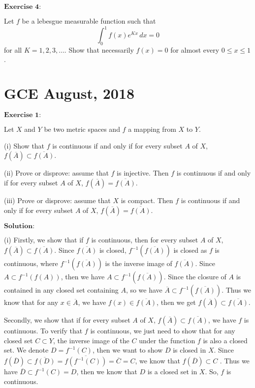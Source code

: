 \documentclass[12pt]{article}
\begin{document}
$\textbf{Exercise 4:}$

Let $f$ be a lebesgue measurable function such that 
\begin{equation*}
   \int_{0}^{1} f(x) e^{Kx} \, d x = 0
\end{equation*}
for all $K = 1, 2, 3, \dots$. Show that necessarily $f(x) = 0$ for almost every $0 \leq x \leq 1$. 



\newpage


\section{ GCE August, 2018}

$\textbf{Exercise 1:}$

Let $X$ and $Y$ be two metric spaces and $f$ a mapping from $X$ to $Y$.

(i) Show that $f$ is continuous if and only if for every subset $A$ of $X$, $f(\overline{A}) \subset  \overline{f(A)}$.

(ii) Prove or disprove: assume that $f$ is injective. Then $f$ is continuous if and only if for every subset $A$ of $X$, $f(\overline{A}) = \overline{f(A)}$. 

(iii) Prove or disprove: assume that $X$ is compact. Then $f$ is continuous if and only if for every subset $A$ of $X$, $f(\overline{A}) = \overline{f(A)}$. 

\vspace{8pt}

$\textbf{Solution:}$

(i) Firstly, we show that if $f$ is continuous, then for every subset $A$ of $X$, $f(\overline{A}) \subset  \overline{f(A)}$. Since $\overline{f(A)}$ is closed, $f^{-1}(\overline{f(A)})$ is closed as $f$ is continuous, where $f^{-1}(\overline{f(A)})$ is the inverse image of $\overline{f(A)}$. Since $A \subset f^{-1} (f(A))$, then we have $A \subset f^{-1}( \overline{f(A)})$. Since the closure of $A$ is contained in any closed set containing $A$, so we have $\overline{A} \subset f^{-1} (\overline{f(A)})$. Thus we know that for any $x \in \overline{A}$, we have $f(x) \in \overline{f(A)}$, then we get $f(\overline{A}) \subset  \overline{f(A)}$.

Secondly, we show that if for every subset $A$ of $X$, $f(\overline{A}) \subset  \overline{f(A)}$, we have $f$ is continuous. To verify that $f$ is continuous, we just need to show that for any closed set $C \subset Y$, the inverse image of the $C$ under the function $f$ is also a closed set. We denote $D = f^{-1}(C)$, then we want to show $D$ is closed in $X$. Since $f(\overline{D}) \subset \overline{f(D)} = \overline{f(f^{-1}(C))} = \overline{C} = C$, we know that $f(\overline{D}) \subset C$
. Thus we have $\overline{D} \subset f^{-1}(C) = D$, then we know that $D$ is a closed set in $X$. So, $f$ is continuous.
\end{document}
